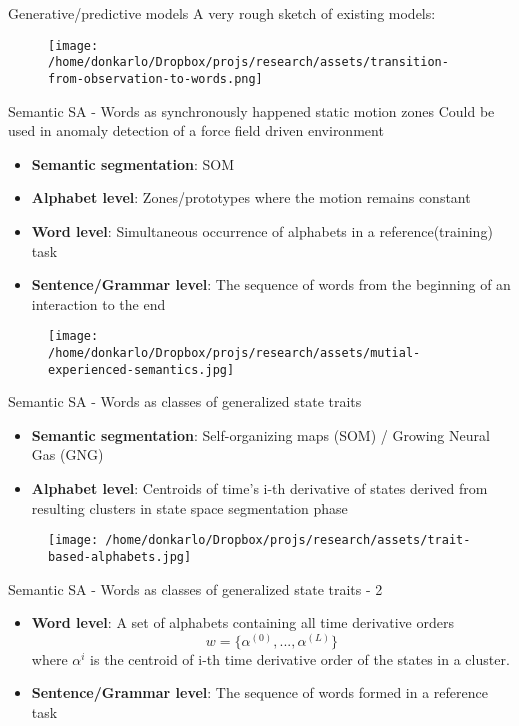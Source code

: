\documentclass[unknownkeysallowed]{beamer}
\begin{document}
	\begin{frame}{Generative/predictive models}
		A very rough sketch of existing models:
		\begin{figure}
			\texttt{[image: /home/donkarlo/Dropbox/projs/research/assets/transition-from-observation-to-words.png]}
			\caption{}
		\end{figure}
	\end{frame}

	\begin{frame}{Semantic SA - Words as synchronously happened static motion zones}
		Could be used in anomaly detection of a force field driven environment
		\begin{itemize}
			\item \textbf{Semantic segmentation}: SOM
			\item \textbf{Alphabet level}: Zones/prototypes where the motion remains constant
			\item \textbf{Word level}: Simultaneous occurrence of alphabets in a reference(training) task
			\item \textbf{Sentence/Grammar level}: The sequence of words from the beginning of an interaction to the end
		\end{itemize}
		\begin{figure}
			\texttt{[image: /home/donkarlo/Dropbox/projs/research/assets/mutial-experienced-semantics.jpg]}
			\caption{}
		\end{figure}
	\end{frame}

	\begin{frame}{Semantic SA - Words as classes of generalized state traits}
		\begin{itemize}
			\item \textbf{Semantic segmentation}: Self-organizing maps (SOM) / Growing Neural Gas (GNG)
			\item \textbf{Alphabet level}: Centroids of time's i-th derivative of states derived from resulting clusters in state space segmentation phase
		\end{itemize}
		\begin{figure}
			\texttt{[image: /home/donkarlo/Dropbox/projs/research/assets/trait-based-alphabets.jpg]}
			\caption{}
		\end{figure}
	\end{frame}

	\begin{frame}{Semantic SA - Words as classes of generalized state traits - 2}
		\begin{itemize}
			\item \textbf{Word level}: A set of alphabets containing all time derivative orders 
			\begin{equation}
			w = \{\alpha^{(0)},...,\alpha^{(L)}\}
			\end{equation}
			where $\alpha^i$ is the centroid of i-th time derivative order of the states in a cluster.
			\item \textbf{Sentence/Grammar level}: The sequence of words formed in a reference task
		\end{itemize}
	\end{frame}
\end{document}
